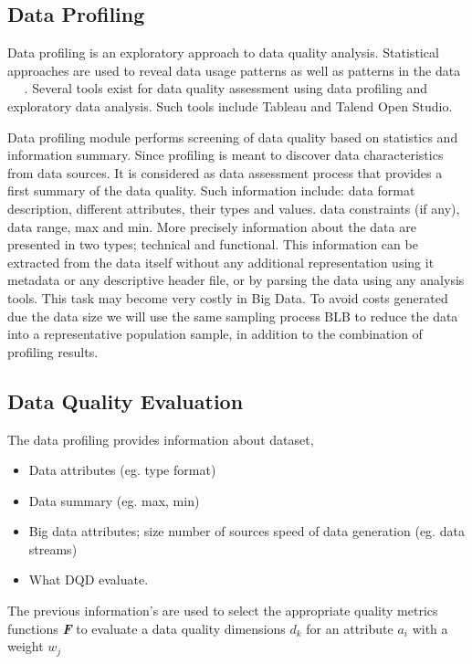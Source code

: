 \subsection{Data Profiling}

Data profiling is an exploratory approach to data quality analysis. Statistical approaches are used to reveal 
data usage patterns as well as patterns in the data ~\cite{Osborne2013} ~\cite{Maydanchik2007}. Several tools exist for data quality assessment using data profiling 
and exploratory data analysis. Such tools include Tableau and Talend Open Studio. 

Data profiling module performs screening of data quality
based on statistics and information summary. Since
profiling is meant to discover data characteristics from data sources. It is considered as data assessment process that
provides a first summary of the data quality. Such information include: data format description, different
attributes, their types and values. data constraints (if any),
data range, max and min. More precisely information about
the data are presented in two types; technical and functional. This information can be extracted from the data itself
without any additional representation using it metadata or any descriptive header file, or by parsing the data using any
analysis tools. This task may become very costly in Big Data. To avoid costs generated due the data size we will use
the same sampling process BLB to reduce the data into a representative population sample, in addition to the combination of profiling results.

\subsection{Data Quality Evaluation}

The data profiling provides information about dataset, 

\begin{itemize}
	\item { Data attributes (eg. type format)}
	\item { Data summary (eg. max, min)}
	\item {Big data attributes; size number of sources speed of data generation (eg. data streams)}
	\item {What DQD evaluate.}
\end{itemize}

The previous information's are used to select the appropriate quality metrics functions \textbf{\textit{F}}
to evaluate a data quality dimensions \textbf{\textit{$d_k$}} for an attribute \textbf{\textit{$a_i$}}
with a weight \textbf{\textit{$w_j$}}

